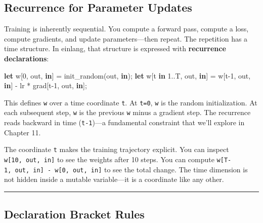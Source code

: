 \documentclass[11pt,]{article}
\newenvironment{Shaded}{}{}
\newcommand{\DecValTok}[1]{\textcolor[rgb]{0.25,0.63,0.44}{#1}}
\newcommand{\KeywordTok}[1]{\textcolor[rgb]{0.00,0.44,0.13}{\textbf{#1}}}
\newcommand{\NormalTok}[1]{#1}
\newcommand{\OperatorTok}[1]{\textcolor[rgb]{0.40,0.40,0.40}{#1}}
\begin{document}
\hypertarget{recurrence-for-parameter-updates}{%
\subsection{Recurrence for Parameter
Updates}\label{recurrence-for-parameter-updates}}

Training is inherently sequential. You compute a forward pass, compute a
loss, compute gradients, and update parameters---then repeat. The
repetition has a time structure. In einlang, that structure is expressed
with \textbf{recurrence declarations}:

\begin{Shaded}
\begin{Highlighting}[]
\KeywordTok{let}\NormalTok{ w}\OperatorTok{[}\DecValTok{0}\NormalTok{, out, }\KeywordTok{in}\OperatorTok{]}\NormalTok{ = init_random(out, }\KeywordTok{in}\NormalTok{);}
\KeywordTok{let}\NormalTok{ w}\OperatorTok{[}\NormalTok{t }\KeywordTok{in} \DecValTok{1.}\NormalTok{.T, out, }\KeywordTok{in}\OperatorTok{]}\NormalTok{ = w}\OperatorTok{[}\NormalTok{t-}\DecValTok{1}\NormalTok{, out, }\KeywordTok{in}\OperatorTok{]}\NormalTok{ - lr * grad}\OperatorTok{[}\NormalTok{t-}\DecValTok{1}\NormalTok{, out, }\KeywordTok{in}\OperatorTok{]}\NormalTok{;}
\end{Highlighting}
\end{Shaded}

This defines \texttt{w} over a time coordinate \texttt{t}. At
\texttt{t=0}, \texttt{w} is the random initialization. At each
subsequent step, \texttt{w} is the previous \texttt{w} minus a gradient
step. The recurrence reads backward in time (\texttt{t-1})---a
fundamental constraint that we'll explore in Chapter 11.

The coordinate \texttt{t} makes the training trajectory explicit. You
can inspect \texttt{w{[}10,\ out,\ in{]}} to see the weights after 10
steps. You can compute
\texttt{w{[}T-1,\ out,\ in{]}\ -\ w{[}0,\ out,\ in{]}} to see the total
change. The time dimension is not hidden inside a mutable variable---it
is a coordinate like any other.

\begin{center}\rule{0.5\linewidth}{0.4pt}\end{center}

\hypertarget{declaration-bracket-rules}{%
\subsection{Declaration Bracket Rules}\label{declaration-bracket-rules}}
\end{document}
